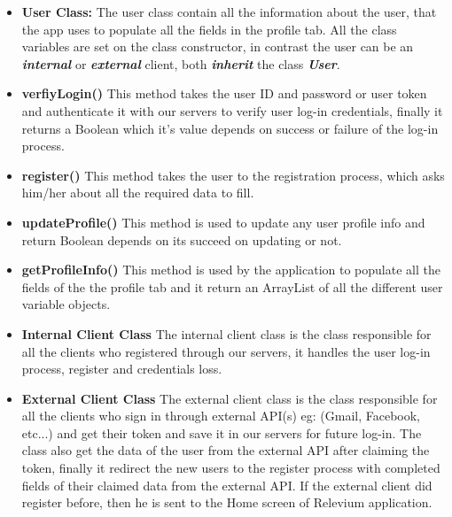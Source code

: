 \documentclass{scrreprt}
\begin{document}
\hspace{-2.5cm}
\begin{minipage}{0.7\textwidth}


\begin{itemize}
    \item \textbf{User Class:} The user class contain all the information about the user, that the app uses to populate all the fields in the profile tab. All the class variables are set on the class constructor, in contrast the user can be an \textbf{\textit{internal}} or \textbf{\textit{external}} client, both \textit{\textbf{inherit}}  the class \textbf{\textit{User}}.

    \item  \textbf{verfiyLogin()}  This method takes the user ID and password or user token and authenticate it with our servers to verify user log-in credentials, finally it returns a Boolean which it's value depends on success or failure of the log-in process.
\item \textbf{register()} This method takes the user to the registration process, which asks him/her about all the required data to fill.
\item \textbf{updateProfile()} This method is used to update any user profile info and return Boolean depends on its succeed on updating or not.
\item \textbf{getProfileInfo()} This method is used by the application to populate all the fields of the the profile tab and it return an ArrayList of all the different user variable objects.

\item \textbf{Internal Client Class}  The internal client class is the class responsible for all the clients who registered through our servers, it handles the user log-in process, register and credentials loss.
\item \textbf{External Client Class} The external client class is the class responsible for all the clients who sign in through external API(s) eg: (Gmail, Facebook, etc...) and get their token and save it in our servers for future log-in. The class also get the data of the user from the external API after claiming the token, finally it redirect the new users to the register process with completed fields of their claimed data from the external API. If the external client did register before, then he is sent to the Home screen of Relevium application.
\end{itemize}
\end{minipage}
\begin{minipage}{0.4\textwidth}
\hspace{-1.5cm}
\end{minipage}
\end{document}
